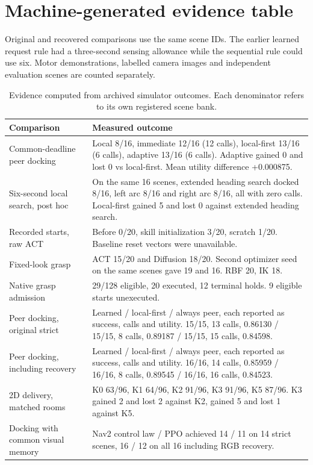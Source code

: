 \documentclass[conference]{IEEEtran}
\begin{document}
\section*{Machine-generated evidence table}
Original and recovered comparisons use the same scene IDs. The earlier learned request rule had a three-second sensing allowance while the sequential rule could use six. Motor demonstrations, labelled camera images and independent evaluation scenes are counted separately.
\begin{table}[t]
\centering\footnotesize
\caption{Evidence computed from archived simulator outcomes. Each denominator refers to its own registered scene bank.}
\begin{tabular}{@{}p{}p{}@{}}\hline
Comparison & Measured outcome \\\hline
Common-deadline peer docking & Local 8/16, immediate 12/16 (12 calls), local-first 13/16 (6 calls), adaptive 13/16 (6 calls). Adaptive gained 0 and lost 0 vs local-first. Mean utility difference +0.000875. \\
Six-second local search, post hoc & On the same 16 scenes, extended heading search docked 8/16, left arc 8/16 and right arc 8/16, all with zero calls. Local-first gained 5 and lost 0 against extended heading search. \\
Recorded starts, raw ACT & Before 0/20, skill initialization 3/20, scratch 1/20. Baseline reset vectors were unavailable. \\
Fixed-look grasp & ACT 15/20 and Diffusion 18/20. Second optimizer seed on the same scenes gave 19 and 16. RBF 20, IK 18. \\
Native grasp admission & 29/128 eligible, 20 executed, 12 terminal holds. 9 eligible starts unexecuted. \\
Peer docking, original strict & Learned / local-first / always peer, each reported as success, calls and utility. 15/15, 13 calls, 0.86130 / 15/15, 8 calls, 0.89187 / 15/15, 15 calls, 0.84598. \\
Peer docking, including recovery & Learned / local-first / always peer, each reported as success, calls and utility. 16/16, 14 calls, 0.85959 / 16/16, 8 calls, 0.89545 / 16/16, 16 calls, 0.84523. \\
2D delivery, matched rooms & K0 63/96, K1 64/96, K2 91/96, K3 91/96, K5 87/96. K3 gained 2 and lost 2 against K2, gained 5 and lost 1 against K5. \\
Docking with common visual memory & Nav2 control law / PPO achieved 14 / 11 on 14 strict scenes, 16 / 12 on all 16 including RGB recovery. \\

\end{tabular}
\end{table}
\end{document}
